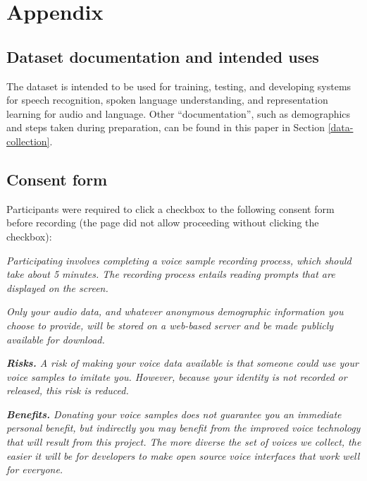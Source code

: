 \documentclass{article}
\begin{document}
\appendix

\clearpage
\section{Appendix}













\subsection{Dataset documentation and intended uses}

The dataset is intended to be used for training, testing, and developing systems for speech recognition, spoken language understanding, and representation learning for audio and language. Other ``documentation'', such as demographics and steps taken during preparation, can be found in this paper in Section \ref{data-collection}.

\subsection{Consent form}\label{consent-form}
Participants were required to click a checkbox to the following consent form before recording (the page did not allow proceeding without clicking the checkbox):
    
\textit{Participating involves completing a voice sample recording process, which should take about 5 minutes. The recording process entails reading prompts that are displayed on the screen.}
                        
                        

                        \textit{Only your audio data, and whatever anonymous demographic information you choose to provide, will be stored on a web-based server and be made publicly available for download.}
                        

                        \textit{\textbf{Risks.} A risk of making your voice data available is that someone could use your voice samples to imitate you. However, because your identity is not recorded or released, this risk is reduced.}

                        \textit{\textbf{Benefits.} Donating your voice samples does not guarantee you an immediate personal benefit, but indirectly you may benefit from the improved voice technology that will result from this project. The more diverse the set of voices we collect, the easier it will be for developers to make open source voice interfaces that work well for everyone.}
\end{document}
